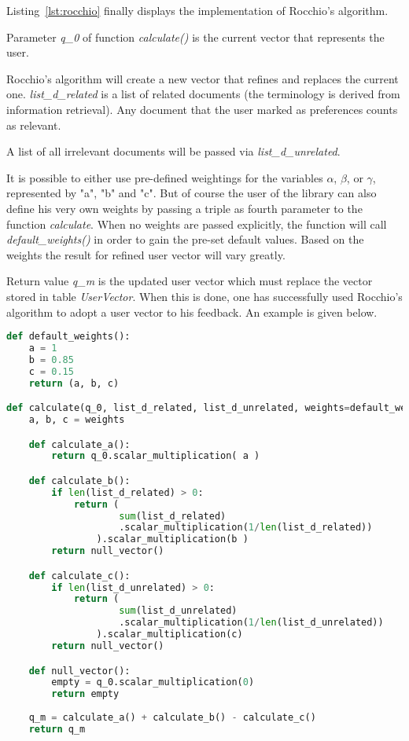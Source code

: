 Listing~\ref{lst:rocchio} finally displays the implementation of Rocchio's algorithm.

Parameter \textit{q\_0} of function \textit{calculate()} is the current vector that represents the user.

Rocchio's algorithm will create a new vector that refines and replaces the current one.
\textit{list\_d\_related} is a list of related documents (the terminology is derived from information retrieval).
Any document that the user marked as preferences counts as relevant.

A list of all irrelevant documents will be passed via \textit{list\_d\_unrelated}.

It is possible to either use pre-defined weightings for the variables $\alpha$, $\beta$, or $\gamma$, represented by "a", "b" and "c".
But of course the user of the library can also define his very own weights by passing a triple as fourth parameter to the function \textit{calculate}.
When no weights are passed explicitly, the function will call \textit{default\_weights()} in order to gain the pre-set default values.
Based on the weights the result for refined user vector will vary greatly.

Return value \textit{q\_m} is the updated user vector which must replace the vector stored in table \textit{UserVector}.
When this is done, one has successfully used Rocchio's algorithm to adopt a user vector to his feedback.
An example is given below.

\begin{lstlisting}[language=Python,caption={Implementation of Rocchio's algorithm},label={lst:rocchio},float=h]
def default_weights():
    a = 1
    b = 0.85
    c = 0.15
    return (a, b, c)

def calculate(q_0, list_d_related, list_d_unrelated, weights=default_weights()):
    a, b, c = weights

    def calculate_a():
        return q_0.scalar_multiplication( a )

    def calculate_b():
        if len(list_d_related) > 0:
            return (
                    sum(list_d_related)
                    .scalar_multiplication(1/len(list_d_related))
                ).scalar_multiplication(b )
        return null_vector()

    def calculate_c():
        if len(list_d_unrelated) > 0:
            return (
                    sum(list_d_unrelated)
                    .scalar_multiplication(1/len(list_d_unrelated))
                ).scalar_multiplication(c)
        return null_vector()

    def null_vector():
        empty = q_0.scalar_multiplication(0)
        return empty
        
    q_m = calculate_a() + calculate_b() - calculate_c()
    return q_m
\end{lstlisting}

